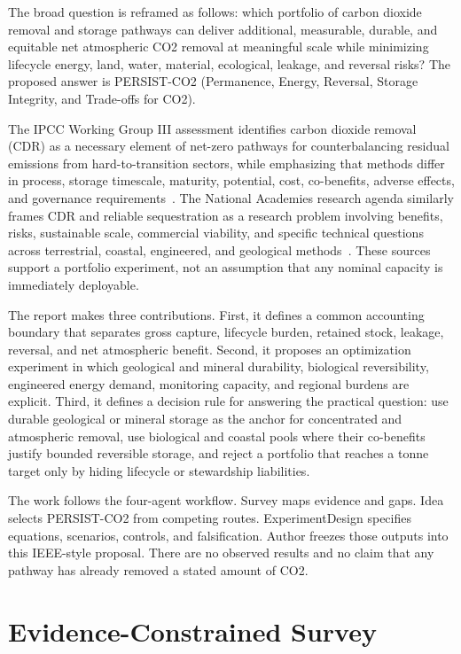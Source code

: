 \documentclass[conference]{IEEEtran}
\begin{document}
The broad question is reframed as follows: which portfolio of carbon dioxide removal and storage pathways can deliver additional, measurable, durable, and equitable net atmospheric CO2 removal at meaningful scale while minimizing lifecycle energy, land, water, material, ecological, leakage, and reversal risks? The proposed answer is PERSIST-CO2 (Permanence, Energy, Reversal, Storage Integrity, and Trade-offs for CO2).

The IPCC Working Group III assessment identifies carbon dioxide removal (CDR) as a necessary element of net-zero pathways for counterbalancing residual emissions from hard-to-transition sectors, while emphasizing that methods differ in process, storage timescale, maturity, potential, cost, co-benefits, adverse effects, and governance requirements~\cite{ipccwg3}. The National Academies research agenda similarly frames CDR and reliable sequestration as a research problem involving benefits, risks, sustainable scale, commercial viability, and specific technical questions across terrestrial, coastal, engineered, and geological methods~\cite{nas2019}. These sources support a portfolio experiment, not an assumption that any nominal capacity is immediately deployable.

The report makes three contributions. First, it defines a common accounting boundary that separates gross capture, lifecycle burden, retained stock, leakage, reversal, and net atmospheric benefit. Second, it proposes an optimization experiment in which geological and mineral durability, biological reversibility, engineered energy demand, monitoring capacity, and regional burdens are explicit. Third, it defines a decision rule for answering the practical question: use durable geological or mineral storage as the anchor for concentrated and atmospheric removal, use biological and coastal pools where their co-benefits justify bounded reversible storage, and reject a portfolio that reaches a tonne target only by hiding lifecycle or stewardship liabilities.

The work follows the four-agent workflow. Survey maps evidence and gaps. Idea selects PERSIST-CO2 from competing routes. ExperimentDesign specifies equations, scenarios, controls, and falsification. Author freezes those outputs into this IEEE-style proposal. There are no observed results and no claim that any pathway has already removed a stated amount of CO2.

\section{Evidence-Constrained Survey}
\end{document}
